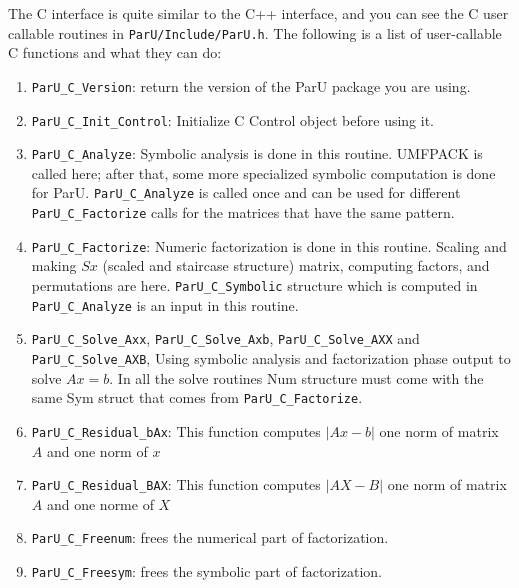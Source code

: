 \documentclass[12pt]{article}
\begin{document}
The C interface is quite similar to the C++ interface, and you can see the C user 
callable routines in 
\verb'ParU/Include/ParU.h'.
The following is a list of user-callable C functions and what they
can do:

\begin{enumerate}

    \item \verb'ParU_C_Version': return the version of the ParU package 
        you are using.

    \item \verb'ParU_C_Init_Control': Initialize C Control object before using 
        it.

    \item \verb'ParU_C_Analyze': Symbolic analysis is done in this routine. 
        UMFPACK is called here; after that, some more specialized symbolic
        computation is done for ParU. 
        \verb'ParU_C_Analyze' is called once and can be used for different 
        \verb'ParU_C_Factorize' calls for the matrices that have the same pattern.
    \item \verb'ParU_C_Factorize': 
        Numeric factorization is done in this routine. Scaling and
        making $Sx$ (scaled and staircase structure) matrix, computing factors,  
        and permutations are here. \verb'ParU_C_Symbolic' structure which is 
        computed in \verb'ParU_C_Analyze' is an input in this routine.

    \item \verb'ParU_C_Solve_Axx',  \verb'ParU_C_Solve_Axb', 
        \verb'ParU_C_Solve_AXX' and \verb'ParU_C_Solve_AXB',  
        Using symbolic analysis and factorization phase output to solve $Ax=b$.
        In all the solve routines Num structure must come with the same 
        Sym struct that comes from \verb'ParU_C_Factorize'. 

    \item \verb'ParU_C_Residual_bAx':  
        This function computes $|Ax-b|$ one norm of matrix $A$ and one norm of
        $x$ 

    \item \verb'ParU_C_Residual_BAX':  
        This function computes $|AX-B|$ one norm of matrix $A$ and one norme of
        $X$


    \item \verb'ParU_C_Freenum':  frees the numerical part of factorization.


    \item \verb'ParU_C_Freesym':  frees the symbolic part of factorization.

\end{enumerate}
\end{document}
